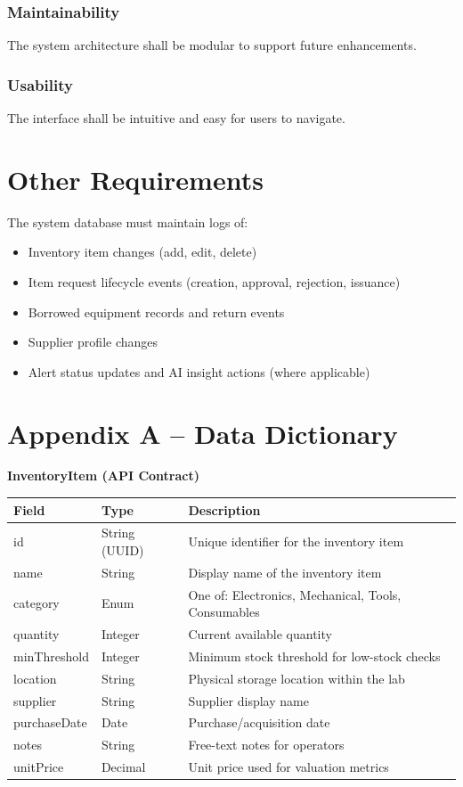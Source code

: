 \documentclass[12pt]{article}
\begin{document}
\subsubsection{Maintainability}

The system architecture shall be modular to support future enhancements.

\subsubsection{Usability}

The interface shall be intuitive and easy for users to navigate.

\section{Other Requirements}

The system database must maintain logs of:

\begin{itemize}
\item Inventory item changes (add, edit, delete)
\item Item request lifecycle events (creation, approval, rejection, issuance)
\item Borrowed equipment records and return events
\item Supplier profile changes
\item Alert status updates and AI insight actions (where applicable)
\end{itemize}

\section*{Appendix A -- Data Dictionary}

\textbf{InventoryItem (API Contract)}

\begin{center}
\begin{tabular}{|l|l|p{7cm}|}
\hline
\textbf{Field} & \textbf{Type} & \textbf{Description} \\
\hline
id & String (UUID) & Unique identifier for the inventory item \\
name & String & Display name of the inventory item \\
category & Enum & One of: Electronics, Mechanical, Tools, Consumables \\
quantity & Integer & Current available quantity \\
minThreshold & Integer & Minimum stock threshold for low-stock checks \\
location & String & Physical storage location within the lab \\
supplier & String & Supplier display name \\
purchaseDate & Date & Purchase/acquisition date \\
notes & String & Free-text notes for operators \\
unitPrice & Decimal & Unit price used for valuation metrics \\
\hline
\end{tabular}
\end{center}
\end{document}
